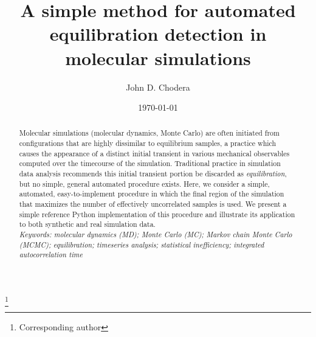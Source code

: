 \documentclass[aps,pre,twocolumn,nofootinbib,superscriptaddress,linenumbers]{revtex4-1}
\begin{document}

\title{A simple method for automated equilibration detection in molecular simulations}

\author{John D. Chodera}
 \thanks{Corresponding author}

\date{\today}


\begin{abstract}

Molecular simulations (molecular dynamics, Monte Carlo) are often initiated from configurations that are highly dissimilar to equilibrium samples, a practice which causes the appearance of a distinct initial transient in various mechanical observables computed over the timecourse of the simulation.
Traditional practice in simulation data analysis recommends this initial transient portion be discarded as \emph{equilibration}, but no simple, general automated procedure exists.
Here, we consider a simple, automated, easy-to-implement procedure in which the final region of the simulation that maximizes the number of effectively uncorrelated samples is used.
We present a simple reference Python implementation of this procedure and illustrate its application to both synthetic and real simulation data.\\

\emph{Keywords: molecular dynamics (MD); Monte Carlo (MC); Markov chain Monte Carlo (MCMC); equilibration; timeseries analysis; statistical inefficiency; integrated autocorrelation time}

\end{abstract}

\maketitle

\end{document}
